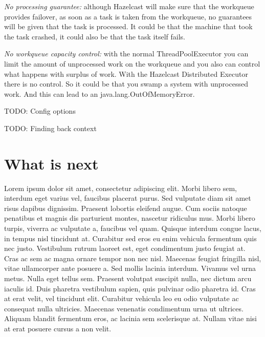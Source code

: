 \emph{No processing guarantee:} although Hazelcast will make sure that the workqueue provides failover, as soon as a task is taken from the workqueue, no guarantees will be given that the task is processed. It could be that the machine that took the task crashed, it could also be that the task itself fails. 

\emph{No workqueue capacity control:} with the normal ThreadPoolExecutor you can limit the amount of unprocessed work on the workqueue and you also can control what happens with surplus of work. With the Hazelcast Distributed Executor there is no control. So it could be that you swamp a system with unprocessed work. And this can lead to an java.lang.OutOfMemoryError.

TODO: Config options

TODO: Finding back context

\section{What is next}
Lorem ipsum dolor sit amet, consectetur adipiscing elit. Morbi libero sem,
interdum eget varius vel, faucibus placerat purus. Sed vulputate diam sit amet
risus dapibus dignissim. Praesent lobortis eleifend augue. Cum sociis natoque
penatibus et magnis dis parturient montes, nascetur ridiculus mus. Morbi libero
turpis, viverra ac vulputate a, faucibus vel quam. Quisque interdum congue
lacus, in tempus nisl tincidunt at. Curabitur sed eros eu enim vehicula
fermentum quis nec justo. Vestibulum rutrum laoreet est, eget condimentum justo
feugiat at. Cras ac sem ac magna ornare tempor non nec nisl. Maecenas feugiat
fringilla nisl, vitae ullamcorper ante posuere a. Sed mollis lacinia interdum.
Vivamus vel urna metus. Nulla eget tellus sem. Praesent volutpat suscipit nulla,
nec dictum arcu iaculis id. Duis pharetra vestibulum sapien, quis pulvinar odio
pharetra id. Cras at erat velit, vel tincidunt elit. Curabitur vehicula leo eu
odio vulputate ac consequat nulla ultricies. Maecenas venenatis condimentum
urna ut ultrices. Aliquam blandit fermentum eros, ac lacinia sem scelerisque
at. Nullam vitae nisi at erat posuere cursus a non velit.
